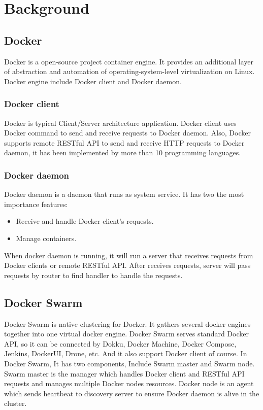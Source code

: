 \chapter{Background}
\label{chap:background}
\section{Docker}
Docker is a open-source project container engine. It provides an additional layer of abstraction and automation of operating-system-level virtualization on Linux. Docker engine include Docker client and Docker daemon.
\subsection{Docker client}
Docker is typical Client/Server architecture application. Docker client uses Docker command to send and receive requests to Docker daemon. Also, Docker supports remote RESTful API to send and receive HTTP requests to Docker daemon, it has been implemented by more than 10 programming languages.
\subsection{Docker daemon}
Docker daemon is a daemon that runs as system service. It has two the most importance features: 
\begin{itemize}
    \item Receive and handle Docker client's requests.
    \item Manage containers.
\end{itemize}
When docker daemon is running, it will run a server that receives requests from Docker clients or remote RESTful API. After receives requests, server will pass requests by router to find handler to handle the requests.
\section{Docker Swarm}
Docker Swarm is native clustering for Docker. It gathers several docker engines together into  one virtual docker engine. Docker Swarm serves standard Docker API, so it can be connected by Dokku, Docker Machine, Docker Compose, Jenkins, DockerUI, Drone, etc. And it also support Docker client of course.
In Docker Swarm, It has two components, Include Swarm master and Swarm node. Swarm master is the manager which handles Docker client and RESTful API requests and manages multiple Docker nodes resources. Docker node is an agent which sends heartbeat to discovery server to ensure Docker daemon is alive in the cluster.
